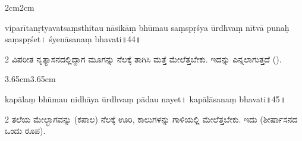 \begin{adjustwidth}{2cm}{2cm}
\begin{sans}
viparītanṛtyavatsaṃsthitau nāsikāṃ\endnote{nāsikāṃ~] \textit{corr.},  nāśikāṃ M.} bhūmau saṃspṛśya ūrdhvaṃ nītvā punaḥ saṃspṛśet\!। śyenāsanaṃ bhavati\!॥44\!॥
\end{sans}

\begin{multicols}{2}
{ವಿಪರೀತ ನೃತ್ಯಾಸನದಲ್ಲಿದ್ದಾಗ ಮೂಗನ್ನು ನೆಲಕ್ಕೆ ತಾಗಿಸಿ ಮತ್ತೆ ಮೇಲೆತ್ತಬೇಕು. ಇದನ್ನು  ಎನ್ನಲಾಗುತ್ತದೆ ().}
\end{multicols}
\end{adjustwidth}

\newpage



\vspace{0.5cm}

\begin{adjustwidth}{3.65cm}{3.65cm}
\begin{sans}
kapālaṃ bhūmau nidhāya ūrdhvaṃ pādau nayet\!। kapālāsanaṃ bhavati\!॥45\!॥
\end{sans}

\begin{multicols}{2}
{ತಲೆಯ ಮೇಲ್ಭಾಗವನ್ನು (ಕಪಾಲ) ನೆಲಕ್ಕೆ ಊರಿ, ಕಾಲುಗಳನ್ನು ಗಾಳಿಯಲ್ಲಿ ಮೇಲೆತ್ತಬೇಕು. ಇದು  (ಶೀರ್ಷಾಸನದ ಒಂದು ರೂಪ).}
\end{multicols}
\end{adjustwidth}


\newpage

